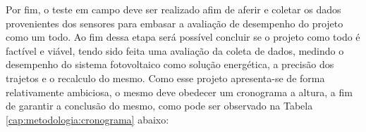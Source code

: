 Por fim, o teste em campo deve ser realizado afim de aferir e coletar os dados provenientes dos sensores para embasar a avaliação de desempenho do projeto como um todo. Ao fim dessa etapa será possível concluir se o projeto como todo é factível e viável, tendo sido feita uma avaliação da coleta de dados, medindo o desempenho do sistema fotovoltaico como solução  energética, a precisão dos trajetos e o recalculo do mesmo.
\newpage
Como esse projeto apresenta-se de forma relativamente ambiciosa, o mesmo deve obedecer um cronograma a altura, a fim de garantir a conclusão do mesmo, como pode ser observado na Tabela \ref{cap:metodologia:cronograma} abaixo:
